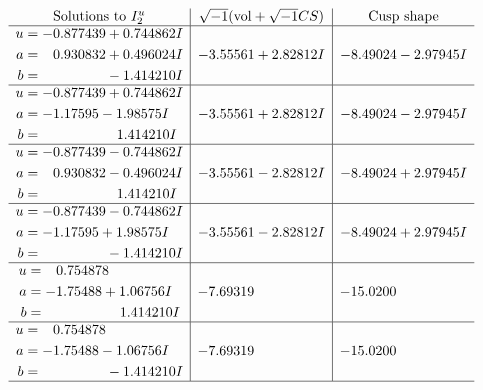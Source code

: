 \documentclass[1p]{elsarticle_modified}
\theoremstyle{definition}
\newcommand{\I}{\sqrt{-1}}
\begin{document}
$$\begin{array}{c|c|c}  
\text{Solutions to }I^u_{2}& \I (\text{vol} + \sqrt{-1}CS) & \text{Cusp shape}\\
 \hline 
\begin{aligned}
u &= -0.877439 + 0.744862 I \\
a &= \phantom{-}0.930832 + 0.496024 I \\
b &= \phantom{-0.000000 } -1.414210 I\end{aligned}
 & -3.55561 + 2.82812 I & -8.49024 - 2.97945 I \\ \hline\begin{aligned}
u &= -0.877439 + 0.744862 I \\
a &= -1.17595 - 1.98575 I \\
b &= \phantom{-0.000000 -}1.414210 I\end{aligned}
 & -3.55561 + 2.82812 I & -8.49024 - 2.97945 I \\ \hline\begin{aligned}
u &= -0.877439 - 0.744862 I \\
a &= \phantom{-}0.930832 - 0.496024 I \\
b &= \phantom{-0.000000 -}1.414210 I\end{aligned}
 & -3.55561 - 2.82812 I & -8.49024 + 2.97945 I \\ \hline\begin{aligned}
u &= -0.877439 - 0.744862 I \\
a &= -1.17595 + 1.98575 I \\
b &= \phantom{-0.000000 } -1.414210 I\end{aligned}
 & -3.55561 - 2.82812 I & -8.49024 + 2.97945 I \\ \hline\begin{aligned}
u &= \phantom{-}0.754878\phantom{ +0.000000I} \\
a &= -1.75488 + 1.06756 I \\
b &= \phantom{-0.000000 -}1.414210 I\end{aligned}
 & -7.69319\phantom{ +0.000000I} & -15.0200\phantom{ +0.000000I} \\ \hline\begin{aligned}
u &= \phantom{-}0.754878\phantom{ +0.000000I} \\
a &= -1.75488 - 1.06756 I \\
b &= \phantom{-0.000000 } -1.414210 I\end{aligned}
 & -7.69319\phantom{ +0.000000I} & -15.0200\phantom{ +0.000000I}\\
 \hline 
 \end{array}$$\newpage\newpage\renewcommand{\arraystretch}{1}
\end{document}

